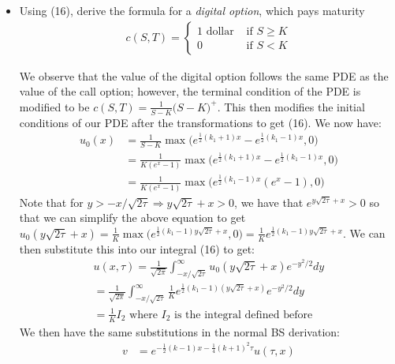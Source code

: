 \documentclass[12pt,twoside, letter]{exam}
\theoremstyle{definition}
\begin{document}
\begin{itemize}
    \item Using (16), derive the formula for a \textit{digital option}, which pays maturity
      \begin{align*}
        c(S,T) =
        \begin{cases}
          1 \text{ dollar} & \text{ if } S \geq K \\
          0 & \text{ if } S < K
        \end{cases}
      \end{align*}

      \begin{solution}
        We observe that the value of the digital option follows the same PDE as the value of the call option; however, the terminal condition
        of the PDE is modified to be $c(S,T) = \frac{1}{S-K}\big(S - K\big)^+$. This then modifies the initial conditions of our PDE after
        the transformations to get (16). We now have:
        \begin{align*}
          u_0(x) &= \frac{1}{S-K}\max\bigg(e^{\frac{1}{2}(k_1 + 1)x} - e^{\frac{1}{2}(k_1 - 1)x}, 0 \bigg) \\
          &= \frac{1}{K(e^{x} - 1)}\max\bigg(e^{\frac{1}{2}(k_1 + 1)x} - e^{\frac{1}{2}(k_1 - 1)x}, 0 \bigg) \\
          &= \frac{1}{K(e^{x} - 1)}\max\bigg(e^{\frac{1}{2}(k_1 - 1)x}(e^{x} - 1) ,0\bigg)
        \end{align*}
        Note that for $y > -x/\sqrt{2\tau} \Rightarrow y\sqrt{2\tau} + x > 0$, we have that $e^{y\sqrt{2\tau} + x} > 0$ so that we can simplify the
        above equation to get $u_0(y\sqrt{2\tau} + x) = \frac{1}{K}\max\bigg(e^{\frac{1}{2}(k_1 - 1)y\sqrt{2\tau} + x} ,0\bigg) = \frac{1}{K}e^{\frac{1}{2}(k_1 - 1)y\sqrt{2\tau} + x}$.
        We can then substitute this into our integral (16) to get:
        \begin{align*}
          u(x,\tau) = \frac{1}{\sqrt{2\pi}} \int^{\infty}_{-x/\sqrt{2\tau}} u_0(y\sqrt{2\tau} + x)e^{-y^2/2} dy\\
          = \frac{1}{\sqrt{2\pi}} \int^{\infty}_{-x/\sqrt{2\tau}} \frac{1}{K}e^{\frac{1}{2}(k_1 - 1)(y\sqrt{2\tau} + x)}e^{-y^2/2} dy \\
          = \frac{1}{K}I_2 \text{ where $I_2$ is the integral defined before}
        \end{align*}
        We then have the same substitutions in the normal BS derivation:
        \begin{align*}
          v &= e^{-\frac{1}{2}(k-1)x-\frac{1}{4}(k+1)^2\tau}u(\tau,x) \\

\end{align*}
\end{solution}
\end{itemize}
\end{document}
